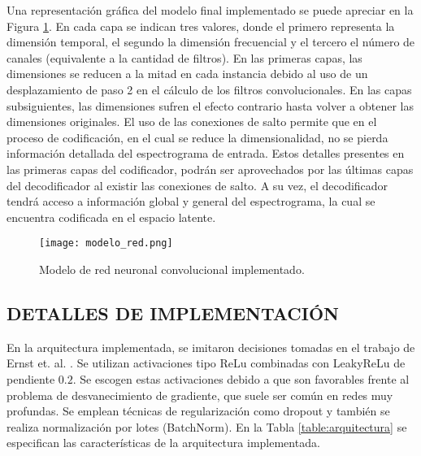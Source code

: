 Una representación gráfica del modelo final implementado se puede apreciar en la Figura \ref{fig:modelo}. En cada capa se indican tres valores, donde el primero representa la dimensión temporal, el segundo la dimensión frecuencial y el tercero el número de canales (equivalente a la cantidad de filtros). En las primeras capas, las dimensiones se reducen a la mitad en cada instancia debido al uso de un desplazamiento de paso 2 en el cálculo de los filtros convolucionales. En las capas subsiguientes, las dimensiones sufren el efecto contrario hasta volver a obtener las dimensiones originales. El uso de las conexiones de salto permite que en el proceso de codificación, en el cual se reduce la dimensionalidad, no se pierda información detallada del espectrograma de entrada. Estos detalles presentes en las primeras capas del codificador, podrán ser aprovechados por las últimas capas del decodificador al existir las conexiones de salto. A su vez, el decodificador tendrá acceso a información global y general del espectrograma, la cual se encuentra codificada en el espacio latente.

\begin{figure}[H]
	\centering{}
	\texttt{[image: modelo\_red.png]}
	\caption{Modelo de red neuronal convolucional implementado.}
	\label{fig:modelo}
\end{figure}

\subsection[Detalles de implementación]{DETALLES DE IMPLEMENTACIÓN}

En la arquitectura implementada, se imitaron decisiones tomadas en el trabajo de Ernst et. al. \cite{FCN}. Se utilizan activaciones tipo ReLu combinadas con LeakyReLu  de pendiente $0.2$. Se escogen estas activaciones debido a que son favorables frente al problema de desvanecimiento de gradiente, que suele ser común en redes muy profundas. Se emplean técnicas de regularización como dropout y también se realiza normalización por lotes (BatchNorm). En la Tabla \ref{table:arquitectura} se especifican las características de la arquitectura implementada. 


